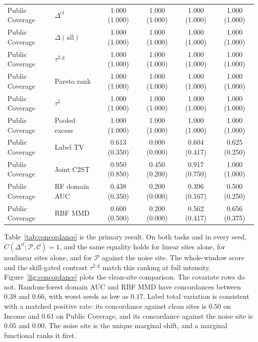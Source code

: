 \begin{table}[t]
\begin{tabular}{llcccc}
\midrule
Public Coverage & $\Delta^{\mathrm{cf}}$ & 1.000 {\scriptsize(1.000)} & 1.000 {\scriptsize(1.000)} & 1.000 {\scriptsize(1.000)} & 1.000 {\scriptsize(1.000)} \\
Public Coverage & $\Delta(\mathrm{all})$ & 1.000 {\scriptsize(1.000)} & 1.000 {\scriptsize(1.000)} & 1.000 {\scriptsize(1.000)} & 1.000 {\scriptsize(1.000)} \\
Public Coverage & $\tau^{2,\mathrm{g}}$ & 1.000 {\scriptsize(1.000)} & 1.000 {\scriptsize(1.000)} & 1.000 {\scriptsize(1.000)} & 1.000 {\scriptsize(1.000)} \\
Public Coverage & Pareto rank & 1.000 {\scriptsize(1.000)} & 1.000 {\scriptsize(1.000)} & 1.000 {\scriptsize(1.000)} & 1.000 {\scriptsize(1.000)} \\
Public Coverage & $\tau^2$ & 1.000 {\scriptsize(1.000)} & 1.000 {\scriptsize(1.000)} & 1.000 {\scriptsize(1.000)} & 1.000 {\scriptsize(1.000)} \\
Public Coverage & Pooled excess & 1.000 {\scriptsize(1.000)} & 1.000 {\scriptsize(1.000)} & 1.000 {\scriptsize(1.000)} & 1.000 {\scriptsize(1.000)} \\
Public Coverage & Label TV & 0.613 {\scriptsize(0.350)} & 0.000 {\scriptsize(0.000)} & 0.604 {\scriptsize(0.417)} & 0.625 {\scriptsize(0.250)} \\
Public Coverage & Joint C2ST & 0.950 {\scriptsize(0.850)} & 0.450 {\scriptsize(0.200)} & 0.917 {\scriptsize(0.750)} & 1.000 {\scriptsize(1.000)} \\
Public Coverage & RF domain AUC & 0.438 {\scriptsize(0.350)} & 0.200 {\scriptsize(0.000)} & 0.396 {\scriptsize(0.167)} & 0.500 {\scriptsize(0.250)} \\
Public Coverage & RBF MMD & 0.600 {\scriptsize(0.500)} & 0.200 {\scriptsize(0.000)} & 0.562 {\scriptsize(0.417)} & 0.656 {\scriptsize(0.375)} \\
\bottomrule
\end{tabular}
\end{table}

Table~\ref{tab:concordance} is the primary result.
On both tasks and in every seed,
$C(\Delta^{\mathrm{cf}};\mathcal{P},\mathcal{C})=1$,
and the same equality holds for linear sites alone, for nonlinear sites
alone, and for $\mathcal{P}$ against the noise site.
The whole-window score and the skill-gated contrast $\tau^{2,\mathrm{g}}$
match this ranking at full intensity.
Figure~\ref{fig:concordance} plots the clean-site comparison.
The covariate rows do not.
Random-forest domain AUC and RBF MMD have concordances between $0.38$ and
$0.66$, with worst seeds as low as $0.17$.
Label total variation is consistent with a matched positive rate: its
concordance against clean sites is $0.50$ on Income and $0.61$ on Public
Coverage, and its concordance against the noise site is $0.05$ and $0.00$.
The noise site is the unique marginal shift, and a marginal functional
ranks it first.

